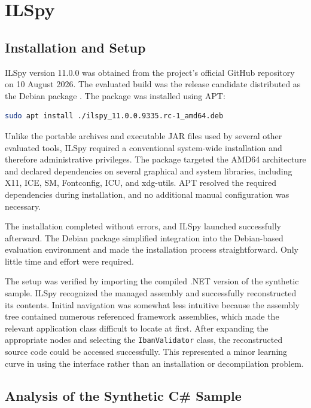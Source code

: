 \section{ILSpy}
\label{sec:analysis:ilspy}

\subsection{Installation and Setup}
\label{subsec:analysis:ilspy:setup}
ILSpy version 11.0.0 was obtained from the project's official GitHub repository on 10 August 2026. The evaluated build was the release candidate distributed as the Debian package 
. The package was installed using APT:

\begin{lstlisting}[language=bash]
sudo apt install ./ilspy_11.0.0.9335.rc-1_amd64.deb
\end{lstlisting}

Unlike the portable archives and executable JAR files used by several other evaluated tools, ILSpy required a conventional system-wide installation and therefore administrative 
privileges. The package targeted the AMD64 architecture and declared dependencies on several graphical and system libraries, including X11, ICE, SM, Fontconfig, ICU, and xdg-utils. 
APT resolved the required dependencies during installation, and no additional manual configuration was necessary.

The installation completed without errors, and ILSpy launched successfully afterward. The Debian package simplified integration into the Debian-based evaluation environment and 
made the installation process straightforward. Only little time and effort were required.

The setup was verified by importing the compiled .NET version of the synthetic sample. ILSpy recognized the managed assembly and successfully reconstructed its contents. 
Initial navigation was somewhat less intuitive because the assembly tree contained numerous referenced framework assemblies, which made the relevant application class difficult to 
locate at first. After expanding the appropriate nodes and selecting the \texttt{IbanValidator} class, the reconstructed source code could be accessed successfully. This 
represented a minor learning curve in using the interface rather than an installation or decompilation problem.

\subsection{Analysis of the Synthetic C\# Sample}
\label{subsec:analysis:ilspy:synthetic}


